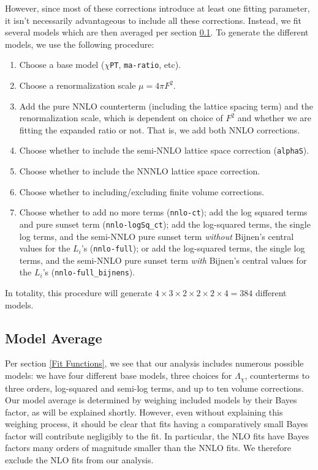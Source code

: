 \documentclass[prd,tightenlines,preprintnumbers,showpacs,superscriptaddress,notitlepage,eqsecnum,floatfix,notitlepage]{revtex4-1}
\begin{document}
However, since most of these corrections introduce at least one fitting parameter, it isn't necessarily advantageous to include all these corrections. Instead, we fit several models which are then averaged per section \ref{section:model_average}. To generate the different models, we use the following procedure:
\begin{enumerate}
	\item Choose a base model (\texttt{$\chi$PT}, \texttt{ma-ratio}, etc).
	\item Choose a renormalization scale $\mu = 4 \pi F^2$.
	\item Add the pure NNLO counterterm (including the lattice spacing term) and the renormalization scale, which is dependent on choice of $F^2$  and whether we are fitting the expanded ratio or not. That is, we add both NNLO corrections.
	\item Choose whether to include the semi-NNLO lattice space correction (\texttt{alphaS}).
	\item Choose whether to include the NNNLO lattice space correction.
	\item Choose whether to including/excluding finite volume corrections.
	\item Choose whether to add no more terms (\texttt{nnlo-ct}); add the log squared  terms and pure sunset term (\texttt{nnlo-logSq\_ct});  add the log-squared terms,  the single log terms, and the semi-NNLO pure sunset term \emph{without} Bijnen's central values for the $L_i$'s  (\texttt{nnlo-full}); or add the log-squared terms,  the single log terms, and the semi-NNLO pure sunset term \emph{with} Bijnen's central values for the $L_i$'s  (\texttt{nnlo-full\_bijnens}).
\end{enumerate}

In totality, this procedure will generate $4 \times 3 \times 2 \times 2 \times 2 \times 4 = 384$ different models.

\subsection{Model Average} \label{section:model_average}
Per section \ref{Fit Functions}, we see that our analysis includes numerous possible models: we have four different base models, three choices for $\Lambda_\chi$, counterterms to three orders, log-squared and semi-log terms, and up to ten volume corrections. Our model average is determined by weighing included models by their Bayes factor, as will be explained shortly. However, even without explaining this weighing process, it should be clear that fits having a comparatively small Bayes factor will contribute negligibly to the fit. In particular, the NLO fits have Bayes factors many orders of magnitude smaller than the NNLO fits. We therefore exclude the NLO fits from our analysis.
\end{document}
